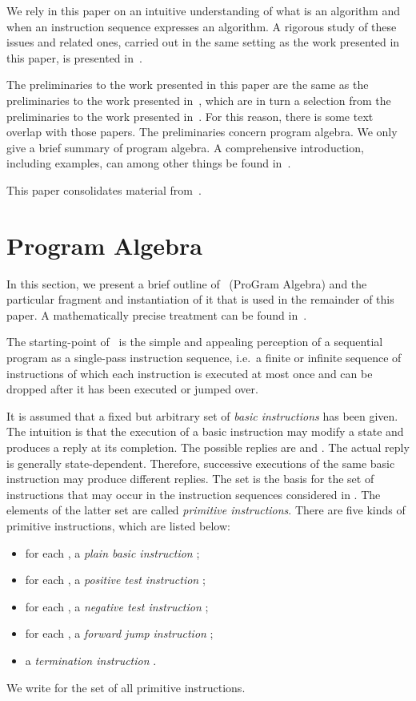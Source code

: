 \documentclass{llncs}
\begin{document}
We rely in this paper on an intuitive understanding of what is an 
algorithm and when an instruction sequence expresses an algorithm.
A rigorous study of these issues and related ones, carried out in the 
same setting as the work presented in this paper, is presented 
in~\cite{BM14a}.

The preliminaries to the work presented in this paper are the same as 
the preliminaries to the work presented in~\cite{BM13b}, which are in
turn a selection from the preliminaries to the work presented 
in~\cite{BM13a}.
For this reason, there is some text overlap with those papers.
The preliminaries concern program algebra.
We only give a brief summary of program algebra.
A comprehensive introduction, including examples, can among other things
be found in~\cite{BM12b}.

This paper consolidates material from~\cite{BM13c,BM13d}.

\section{Program Algebra}
\label{sect-PGA}

In this section, we present a brief outline of \PGA\ (ProGram Algebra) 
and the particular fragment and instantiation of it that is used in 
the remainder of this paper.
A mathematically precise treatment can be found in~\cite{BM13a}.

The starting-point of \PGA\ is the simple and appealing perception
of a sequential program as a single-pass instruction sequence, i.e.\ a
finite or infinite sequence of instructions of which each instruction is
executed at most once and can be dropped after it has been executed or
jumped over.

It is assumed that a fixed but arbitrary set  of
\emph{basic instructions} has been given.
The intuition is that the execution of a basic instruction may modify a 
state and produces a reply at its completion.
The possible replies are  and .
The actual reply is generally state-dependent.
Therefore, successive executions of the same basic instruction may
produce different replies.
The set  is the basis for the set of instructions that may 
occur in the instruction sequences considered in \PGA.
The elements of the latter set are called \emph{primitive instructions}.
There are five kinds of primitive instructions, which are listed below:
\begin{itemize}
\item
for each , a \emph{plain basic instruction} ;
\item
for each , a \emph{positive test instruction} ;
\item
for each , a \emph{negative test instruction} ;
\item
for each , a \emph{forward jump instruction} ;
\item
a \emph{termination instruction} .
\end{itemize}
We write  for the set of all primitive instructions.
\end{document}

